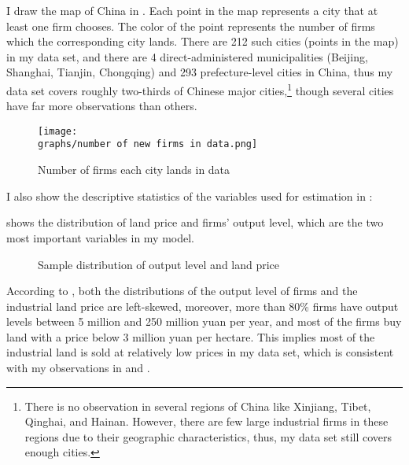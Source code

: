 I draw the map of China in . Each point in the map
represents a city that at least one firm chooses. The color of the point represents
the number of firms which the corresponding city lands. There are 212 such cities
(points in the map) in my data set, and there are 4 direct-administered
municipalities (Beijing, Shanghai, Tianjin, Chongqing) and 293 prefecture-level
cities in China, thus my data set covers roughly two-thirds of Chinese major cities,\footnote{
    There is no observation in several regions of China
    like Xinjiang, Tibet, Qinghai, and Hainan. However, there are few large industrial firms
    in these regions due to their geographic characteristics, thus, my data set still covers
    enough cities.}
though several cities have far more observations than others.

\begin{figure}[H]
    \centering
    \caption{Number of firms each city lands in data}
    \texttt{[image: \\graphs/number of new firms in data.png]}
    \label{firm_city_map}
\end{figure}





I also show the descriptive statistics of the variables used for estimation in :


 shows
the distribution of land price and firms' output level,
which are the two most important variables in my model.

\begin{figure}[H]
    \centering
    \caption{Sample distribution of output level and land price}
    \label{distribution of output and price}
\end{figure}

According to ,
both the distributions of the output level of firms and the industrial land price are left-skewed,
moreover, more than 80\% firms have output levels between 5 million
and 250 million yuan per year, and most of the firms buy land with a price below 3 million yuan per
hectare. This implies most of the industrial land is sold at relatively low prices in my data set,
which is consistent with my observations in  and .


